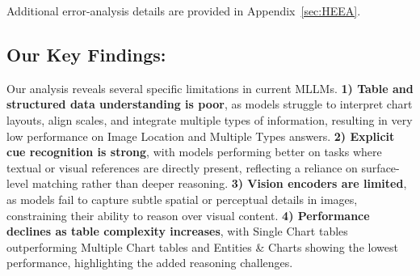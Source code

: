 \documentclass[11pt]{article}
\begin{document}
Additional error-analysis details are provided in Appendix~\ref{sec:HEEA}.

\vspace{-0.3em}

\subsection{Our Key Findings: }
Our analysis reveals several specific limitations in current MLLMs. \textbf{1) Table and structured data understanding is poor}, as models struggle to interpret chart layouts, align scales, and integrate multiple types of information, resulting in very low performance on Image Location and Multiple Types answers. \textbf{2) Explicit cue recognition is strong}, with models performing better on tasks where textual or visual references are directly present, reflecting a reliance on surface-level matching rather than deeper reasoning. \textbf{3) Vision encoders are limited}, as models fail to capture subtle spatial or perceptual details in images, constraining their ability to reason over visual content. \textbf{4) Performance declines as table complexity increases}, with Single Chart tables outperforming Multiple Chart tables and Entities \& Charts showing the lowest performance, highlighting the added reasoning challenges.
\end{document}
